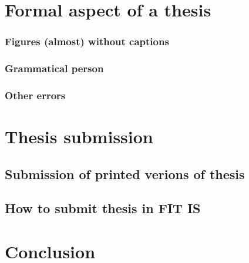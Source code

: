 \chapter{Formal aspect of a thesis}
\label{formality}

\subsection*{Figures (almost) without captions}



\subsection*{Grammatical person}


\subsection*{Other errors}


\chapter{Thesis submission}

\section{Submission of printed verions of thesis}


\section{How to submit thesis in FIT IS}


\chapter{Conclusion}
\label{zaver}


